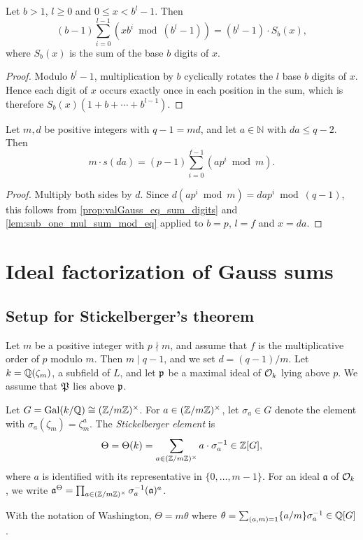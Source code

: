 \begin{lemma}
  \label{lem:sub_one_mul_sum_mod_eq}
  \leanok
  Let $b > 1$, $l \geq 0$ and $0 \leq x < b^l - 1$. Then
  \[
    (b - 1) \sum_{i=0}^{l-1} (x b^i \bmod (b^l - 1)) = (b^l - 1) \cdot S_b(x),
  \]
  where $S_b(x)$ is the sum of the base $b$ digits of $x$.
\end{lemma}

\begin{proof}
  \leanok
  Modulo $b^l - 1$, multiplication by $b$ cyclically rotates the $l$ base $b$ digits of $x$.
  Hence each digit of $x$ occurs exactly once in each position in the sum, which is therefore
  $S_b(x)(1 + b + \cdots + b^{l-1})$.
\end{proof}

\begin{lemma}
  \label{lem:s_mod}
  \leanok
  Let $m, d$ be positive integers with $q - 1 = md$, and let $a \in \mathbb{N}$ with
  $da \leq q - 2$. Then
  \[
    m \cdot s(da) = (p-1) \sum_{i=0}^{f-1} (ap^i \bmod m).
  \]
\end{lemma}

\begin{proof}
  \leanok
  Multiply both sides by $d$. Since $d (ap^i \bmod m) = dap^i \bmod (q-1)$, this follows from
  \ref{prop:valGauss_eq_sum_digits} and \ref{lem:sub_one_mul_sum_mod_eq} applied to $b = p$,
  $l = f$ and $x = da$.
\end{proof}

\chapter{Ideal factorization of Gauss sums}

\section{Setup for Stickelberger's theorem}

Let $m$ be a positive integer with $p \nmid m$, and assume that $f$ is the multiplicative order
of $p$ modulo $m$. Then $m \mid q - 1$, and we set $d = (q-1)/m$. Let $k = \mathbb{Q}(\zeta_m)$, a
subfield of $L$, and let $\mathfrak{p}$ be a maximal ideal of $\mathcal{O}_k$ lying above $p$. We assume that
$\mathfrak{P}$ lies above $\mathfrak{p}$.

Let $G = \mathrm{Gal}(k/\mathbb{Q}) \cong (\mathbb{Z}/m\mathbb{Z})^\times$.
For $a \in (\mathbb{Z}/m\mathbb{Z})^\times$, let $\sigma_a \in G$ denote the element with
$\sigma_a(\zeta_m) = \zeta_m^a$. The \emph{Stickelberger element} is
\[
  \Theta = \Theta(k) = \sum_{a \in (\mathbb{Z}/m\mathbb{Z})^\times} a \cdot \sigma_a^{-1} \in \mathbb{Z}[G],
\]
where $a$ is identified with its representative in $\{0, \ldots, m-1\}$. For an ideal
$\mathfrak{a}$ of $\mathcal{O}_k$, we write
$\mathfrak{a}^{\Theta} = \prod_{a \in (\mathbb{Z}/m\mathbb{Z})^\times} \sigma_a^{-1}(\mathfrak{a})^{a}$.
\begin{remark}
  With the notation of Washington, $\Theta = m\theta$ where
  $\theta = \sum_{(a,m)=1} \{a/m\} \sigma_a^{-1} \in \mathbb{Q}[G]$.
\end{remark}

